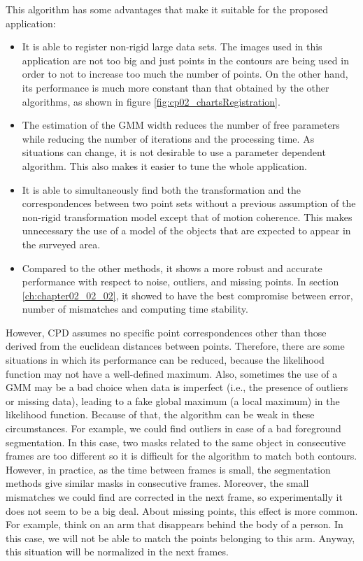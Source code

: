 \begin{itemize}
 This algorithm has some advantages that make it suitable for the proposed application:
 \begin{itemize}
  \item It is able to register non-rigid large data sets. The images used in this application are not too big and just 
points in the contours are being used in order to not to increase too much the number of points. On the other hand, its 
performance is much more constant than that obtained by the other algorithms, as shown in figure 
\ref{fig:cp02_chartsRegistration}.
  \item The estimation of the \ac{GMM} width reduces the number of free parameters while reducing the number of iterations and the processing time. As situations can change, it is not desirable to use a parameter dependent algorithm. This also makes it easier to tune the whole application.
  \item It is able to simultaneously find both the transformation and the correspondences between two point sets without a previous assumption of the non-rigid transformation model except that of motion coherence. This makes unnecessary the use of a model of the objects that are expected to appear in the surveyed area.
  \item Compared to the other methods, it shows a more robust and accurate performance with respect to noise, outliers, 
and missing points. In section \ref{ch:chapter02_02_02}, it showed to have the best compromise between error, 
number of mismatches and computing time stability.
 \end{itemize}
 However, \ac{CPD} assumes no specific point correspondences other than those derived from the euclidean distances between 
points. Therefore, there are some situations in which its performance can be reduced, because the likelihood function may 
not have a well-defined maximum. Also, sometimes the use of a \ac{GMM} may be a bad choice when  
data is imperfect (i.e., the presence of outliers or missing data), leading to a fake global maximum (a local maximum) in the likelihood function. Because of that, the 
algorithm can be weak in these circumstances. For example, we could find outliers in case of a bad foreground segmentation. In this case, two masks related to the same object in consecutive frames are too different so it is difficult for the algorithm to match both contours. However, in practice, as the time between frames is small, the segmentation methods give similar masks in consecutive frames. Moreover, the small mismatches we could find are corrected in the next frame, so experimentally it does not seem to be a big deal. About missing points, this effect is more common. For example, think on an arm that disappears behind the body of a person. In this case, we will not be able to match the points belonging to this arm. Anyway, this situation will be normalized in the next frames.


\end{itemize}
